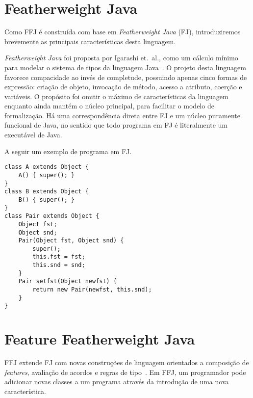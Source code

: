 	\section{Featherweight Java}

	Como FFJ é construída com base em \textit{Featherweight Java} (FJ), introduziremos
brevemente as principais características desta linguagem.

\textit{Featherweight Java} foi proposta por Igarashi et.\ al., como um cálculo 
mínimo para modelar o sistema de tipos da linguagem Java~\cite{Igarashi99featherweightjava}.
O projeto desta linguagem favorece compacidade ao invés de completude, possuindo apenas 
cinco formas de expressão: criação de objeto, invocação de método, acesso a atributo, 
coerção e variáveis. O propósito foi omitir o máximo de características da linguagem 
enquanto ainda mantém o núcleo principal, para facilitar o modelo de formalização. Há 
uma correspondência direta entre FJ e um núcleo puramente funcional de Java, no sentido 
que todo programa em FJ é literalmente um executável de Java.


A seguir um exemplo de programa em FJ.

\begin{lstlisting}
class A extends Object {
	A() { super(); }
}
class B extends Object {
	B() { super(); }
}
class Pair extends Object {
	Object fst;
	Object snd;
	Pair(Object fst, Object snd) {
		super();
		this.fst = fst;
		this.snd = snd;
	}
	Pair setfst(Object newfst) {
		return new Pair(newfst, this.snd);
	}
}
\end{lstlisting}

\section{Feature Featherweight Java}

FFJ extende FJ com novas construções de linguagem orientados a composição de \textit{features},
avaliação de acordos e regras de tipo~\cite{Apel08featurefeatherweight}. Em FFJ, um programador 
pode adicionar novas classes a um programa através da introdução de uma nova característica.
	








